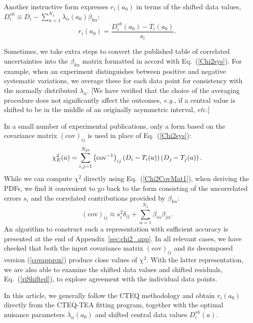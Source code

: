 Another instructive form expresses $r_i(a_0)$ in terms of the
shifted data values, $D_i^{sh}\equiv D_i -
\sum_{\alpha=1}^{N_{\lambda}}\overline \lambda_{\alpha}(a_0) \beta_{k\alpha}$:
\begin{equation}
r_{i}(a_0) = \frac{D_{i}^{sh}(a_0)-T_{i}(a_0)}{s_{i}}. \label{riShifted}
\end{equation}

Sometimes, we take extra steps to
convert the published table of correlated
uncertainties into the $\beta_{k\alpha}$ matrix formatted in accord
with Eq.~(\ref{Chi2sys}).
For example, when an experiment distinguishes between positive
and negative systematic variations, we average these for each data
point for consistency with the normally distributed $\lambda_{\alpha}$.
{[}We have verified that the choice of the averaging procedure
does not significantly affect the
outcomes, {\it e.g.}, if a central value is shifted to be in the middle of an originally
asymmetric interval, {\it etc.}{]}

In a small number of  experimental publications, only
a form based on the covariance
matrix $\left(\mbox{cov}\right)_{ij}$ is used in place of Eq.~(\ref{Chi2sys}):
\begin{equation}
\chi_{E}^{2}(a)=\sum_{i,j=1}^{N_{pt}}\left(\mbox{\mbox{cov}}^{-1}\right)_{ij}\left(D_{i}-T_{i}(a)\right)\left(D_{j}-T_{j}(a)\right).\label{Chi2CovMat1}
\end{equation}
While we can compute $\chi^2$ directly using
Eq.~(\ref{Chi2CovMat1}), when deriving the PDFs, we find it convenient
to go back to the form consisting of the uncorrelated errors $s_i$ and
the correlated contributions provided by $\beta_{k\alpha}$:
\begin{equation}
  (\mbox{cov})_{ij} \approx s_i^2 \delta_{ij}
  +\sum_{\alpha=1}^{N_\lambda} \beta_{i\alpha}\beta_{j\alpha}.\label{covapprox}
\end{equation}
An algorithm to construct such a representation with sufficient
accuracy is presented at the end of Appendix~\ref{sec:chi2_app}. In
all relevant cases, we have checked that both the input covariance matrix
$(\mbox{cov})_{ij}$ and its decomposed version (\ref{covapprox})
produce close values of $\chi^2$. With the latter representation, we
are also able to examine the shifted data values and shifted
residuals, Eq.~(\ref{riShifted}), to explore agreement with the
individual data points. 

In this article, we generally follow the CTEQ methodology and obtain
$r_{i}(a_0)$ directly from the CTEQ-TEA fitting program, together
with the optimal nuisance parameters $\overline{\lambda}_{\alpha}(a_0)$
and shifted central data values $D_{i}^{sh}(a).$

